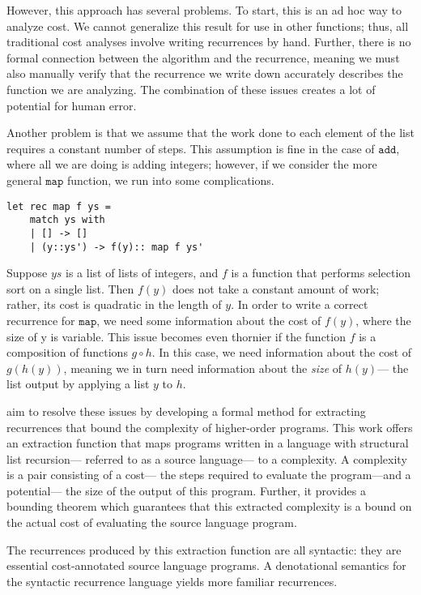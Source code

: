 However, this approach has several problems. To start, this is an ad hoc way to analyze cost. We cannot generalize
this result for use in other functions; thus, all traditional cost analyses involve writing recurrences by hand. Further, there is 
no formal connection between the algorithm and the recurrence, meaning we must also manually verify that the recurrence
we write down accurately describes the function we are analyzing. The combination of these issues creates a lot of potential
for human error.

Another problem is that we assume that the work done to each element of the list requires a constant number of steps. 
This assumption is fine in the case of $\texttt{add}$, where all we are doing is adding integers; however, if we consider
the more general $\texttt{map}$ function, we run into some complications. 
\begin{verbatim}
let rec map f ys =
	match ys with
	| [] -> []
	| (y::ys') -> f(y):: map f ys'
\end{verbatim}
Suppose $ys$ is a list of lists of integers, and $f$ is a function that performs selection sort on a single list. Then $f(y)$ does
not take a constant amount of work; rather, its cost is quadratic in the length of $y$. In order to write a correct recurrence
for $\texttt{map}$, we need some information about the cost of $f(y)$, where the size of y is variable. This issue
becomes even thornier if the function $f$ is a composition of functions $g \circ h$. In this case, we need information about the cost of $g(h(y))$, meaning we in turn need information about the \emph{size} of $h(y)$--- the list output by applying a list $y$ to $h$. 

\cite{N.-Danner:2015aa} aim to resolve these issues by developing a formal method for extracting
recurrences that bound the complexity of higher-order programs. This work offers an extraction function that maps programs written in a language with structural list recursion--- referred to as a source language--- to a complexity. A complexity is a pair consisting of a cost--- the steps required to evaluate the program---and a potential--- the size of the 
output of this program. Further, it provides a bounding theorem which guarantees that this extracted complexity is a 
bound on the actual cost of evaluating the source language program. 

The recurrences produced by this extraction function are all syntactic: they are essential cost-annotated source language
programs. A denotational semantics for the syntactic recurrence language yields more familiar recurrences.

